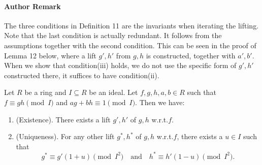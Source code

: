 \paragraph{Author Remark}
The three conditions in Definition 11 are the invariants when iterating the lifting.
Note that the last condition is actually redundant. It follows from the assumptions together with the second condition. This can be seen in the proof of Lemma 12 below, where a lift $g',h'$ from $g,h$ is constructed, together with $a',b'$. When we show that condition(iii) holds, we do not use the specific form of $g',h'$ constructed there, it suffices to have condition(ii).
\begin{ntlemma}
Let $R$ be a ring and $I\subseteq R$ be an ideal. Let $f,g,h,a,b\in R$ such that $f\equiv gh\pmod I$ and $ag+bh\equiv1\pmod I$. Then we have:
\begin{enumerate}
\item (Existence). There exists a lift $g',h'$ of $g,h$ w.r.t.$f$.
\item (Uniqueness). For any other lift $g^*,h^*$ of $g,h$ w.r.t.$f$, there exists a $u\in I$ such that
\[g^*\equiv g'(1+u)\pmod{I^2}\quad\text{and}\quad h^*\equiv h'(1-u)\pmod{I^2}.\]
\end{enumerate}
\end{ntlemma}
